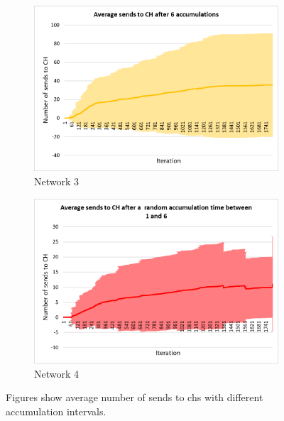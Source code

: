 \documentclass[USenglish]{uit-thesis}
\begin{document}
\begin{figure}
\begin{subfigure}[b]{0.475\textwidth}
            \includegraphics[width=\textwidth]{numSendsCh_stdev_6.png}
            \caption[]%
            {{\small Network 3}}    
            \label{fig:sendchfig3}
        \end{subfigure}
        \quad
        \begin{subfigure}[b]{0.475\textwidth}   
            \centering 
            \includegraphics[width=\textwidth]{numSendsCh_stdev_rand.png}
            \caption[]%
            {{\small Network 4}}    
            \label{fig:sendchfig4}
        \end{subfigure}
        \caption[Figures show average number of sends to \glspl{ch} with different accumulation intervals.]
        {\small Figures show average number of sends to \glspl{ch} with different accumulation intervals.} 
        \label{fig:sendschChart}
    \end{figure}
\end{document}
